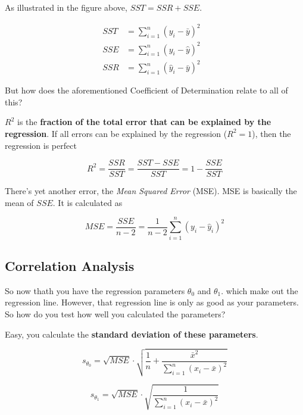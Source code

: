 \documentclass[11pt]{article}
\begin{document}
\vspace{10px}

As illustrated in the figure above, $SST = SSR + SSE$.

\begin{align}
    SST & = \sum^{n}_{i=1}(y_{i}-\bar y)^2        \\
    SSE & = \sum^{n}_{i=1}(y_{i}-\hat y)^2      & \\
    SSR & = \sum^{n}_{i=1}(\hat y_{i}-\bar y)^2
\end{align}


But how does the aforementioned Coefficient of Determination relate to all of this?

$R^2$ is the \textbf{fraction of the total error that can be explained by the regression}. If all errors can be explained by the regression ($R^2 = 1$), then the regression is perfect

\begin{equation}
    R^2 = \frac{SSR}{SST} = \frac{SST-SSE}{SST} = 1 - \frac{SSE}{SST}
\end{equation}

\vspace{10px}

There's yet another error, the \textit{Mean Squared Error} (MSE). MSE is basically the mean of $SSE$. It is calculated as

\begin{equation}
    MSE = \frac{SSE}{n-2} = \frac{1}{n-2}\sum_{i=1}^{n}(y_{i}-\hat{y}^{}_{i})^2
\end{equation}

\newpage

\subsection{Correlation Analysis}

So now thath you have the regression parameters $\theta^{}_{0}$ and $\theta^{}_{1}$. which make out the regression line. However, that regression line is only as good as your parameters. So how do you test how well you calculated the parameters?

Easy, you calculate the \textbf{standard deviation of these parameters}.

\begin{equation}
    s_{\theta_{0}} = \sqrt{MSE} \cdot \sqrt{\frac{1}{n} + \frac{\bar{x}^2}{\sum_{i=1}^{n}{(x_i-\bar{x})^2}}}
\end{equation}

\begin{equation}
    s_{\theta_{1}} = \sqrt{MSE}\cdot \sqrt{\frac{1}{\sum_{i=1}^{n}{(x_i-\bar{x})^2}}}
\end{equation}
\end{document}
